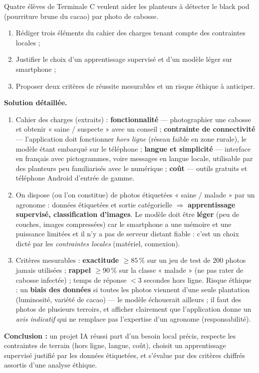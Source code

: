 \documentclass[11pt]{article}
\begin{document}
\begin{exoresolu}
Quatre élèves de Terminale C veulent aider les planteurs à détecter le black pod (pourriture brune du cacao) par photo de cabosse.
\begin{enumerate}
\item Rédiger trois éléments du cahier des charges tenant compte des contraintes locales ;
\item Justifier le choix d'un apprentissage supervisé et d'un modèle léger sur smartphone ;
\item Proposer deux critères de réussite mesurables et un risque éthique à anticiper.
\end{enumerate}
\tcblower
\textbf{Solution détaillée.}
\begin{enumerate}
\item Cahier des charges (extraits) : \textbf{fonctionnalité} — photographier une cabosse et obtenir « saine / suspecte » avec un conseil ; \textbf{contrainte de connectivité} — l'application doit fonctionner \emph{hors ligne} (réseau faible en zone rurale), le modèle étant embarqué sur le téléphone ; \textbf{langue et simplicité} — interface en français avec pictogrammes, voire messages en langue locale, utilisable par des planteurs peu familiarisés avec le numérique ; \textbf{coût} — outils gratuits et téléphone Android d'entrée de gamme.
\item On dispose (ou l'on constitue) de photos étiquetées « saine / malade » par un agronome : données étiquetées et sortie catégorielle $\Rightarrow$ \textbf{apprentissage supervisé, classification d'images}. Le modèle doit être \textbf{léger} (peu de couches, images compressées) car le smartphone a une mémoire et une puissance limitées et il n'y a pas de serveur distant fiable : c'est un choix dicté par les \emph{contraintes locales} (matériel, connexion).
\item Critères mesurables : \textbf{exactitude $\geq 85\,\%$} sur un jeu de test de 200 photos jamais utilisées ; \textbf{rappel $\geq 90\,\%$} sur la classe « malade » (ne pas rater de cabosse infectée) ; temps de réponse $< 3$ secondes hors ligne. Risque éthique : un \textbf{biais des données} si toutes les photos viennent d'une seule plantation (luminosité, variété de cacao) — le modèle échouerait ailleurs ; il faut des photos de plusieurs terroirs, et afficher clairement que l'application donne un \emph{avis indicatif} qui ne remplace pas l'expertise d'un agronome (responsabilité).
\end{enumerate}
\textbf{Conclusion :} un projet IA réussi part d'un besoin local précis, respecte les contraintes de terrain (hors ligne, langue, coût), choisit un apprentissage supervisé justifié par les données étiquetées, et s'évalue par des critères chiffrés assortis d'une analyse éthique.
\end{exoresolu}
\end{document}
